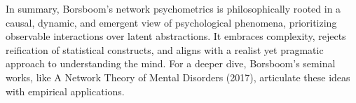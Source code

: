 \documentclass[
  jou,
  floatsintext,
  longtable,
  nolmodern,
  notxfonts,
  notimes,
  colorlinks=true,linkcolor=blue,citecolor=blue,urlcolor=blue]{apa7}
\begin{document}
In summary, Borsboom's network psychometrics is philosophically rooted
in a causal, dynamic, and emergent view of psychological phenomena,
prioritizing observable interactions over latent abstractions. It
embraces complexity, rejects reification of statistical constructs, and
aligns with a realist yet pragmatic approach to understanding the mind.
For a deeper dive, Borsboom's seminal works, like A Network Theory of
Mental Disorders (2017), articulate these ideas with empirical
applications.
\end{document}
